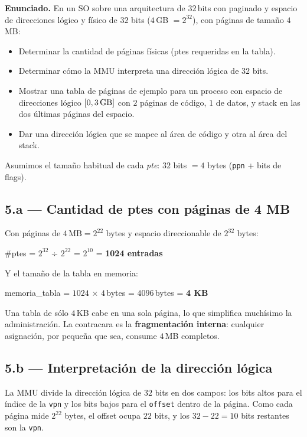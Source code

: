 \documentclass[11pt,a4paper]{article}
\begin{document}
\textbf{Enunciado.} En un SO sobre una arquitectura de $32$\,bits con
paginado y espacio de direcciones lógico y físico de $32$ bits
($4$\,GB $= 2^{32}$), con páginas de tamaño $4$\,MB:

\begin{itemize}[leftmargin=*,nosep]
    \item[(a)] Determinar la cantidad de páginas físicas (ptes
        requeridas en la tabla).
    \item[(b)] Determinar cómo la MMU interpreta una dirección lógica
        de $32$ bits.
    \item[(c)] Mostrar una tabla de páginas de ejemplo para un proceso
        con espacio de direcciones lógico $[0, 3\text{\,GB}]$ con
        $2$ páginas de código, $1$ de datos, y stack en las dos
        últimas páginas del espacio.
    \item[(d)] Dar una dirección lógica que se mapee al área de código
        y otra al área del stack.
\end{itemize}

Asumimos el tamaño habitual de cada \emph{pte}: $32$ bits $= 4$ bytes
(\texttt{ppn} + bits de flags).

\subsection{5.a --- Cantidad de ptes con páginas de 4 MB}

Con páginas de $4\,\text{MB} = 2^{22}$ bytes y espacio direccionable
de $2^{32}$ bytes:

\quad \#ptes = $2^{32}$ ÷ $2^{22}$ = $2^{10}$ = \textbf{1024 entradas}

Y el tamaño de la tabla en memoria:

\quad memoria\_tabla = $1024$ × $4$\,bytes = $4096$\,bytes = \textbf{4 KB}

\begin{idea}
Una tabla de sólo $4$\,KB cabe en una sola página, lo que simplifica
muchísimo la administración. La contracara es la \textbf{fragmentación
interna}: cualquier asignación, por pequeña que sea, consume $4$\,MB
completos.
\end{idea}

\subsection{5.b --- Interpretación de la dirección lógica}

La MMU divide la dirección lógica de $32$ bits en dos campos: los
bits altos para el índice de la \texttt{vpn} y los bits bajos para el
\texttt{offset} dentro de la página. Como cada página mide
$2^{22}$ bytes, el offset ocupa $22$ bits, y los $32 - 22 = 10$ bits
restantes son la \texttt{vpn}.
\end{document}
